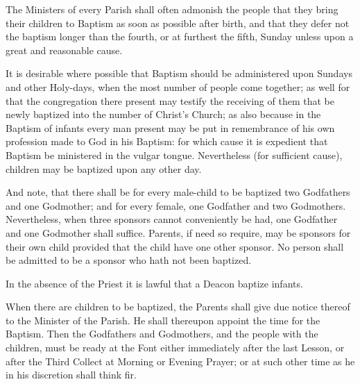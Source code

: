 
\small

\begin{leftbar}

\begin{rubric}
The Ministers of every Parish shall often admonish the people that they bring their children to Baptism as soon as possible after birth, and that they defer not the baptism longer than the fourth, or at furthest the fifth, Sunday unless upon a great and reasonable cause.
\end{rubric}

\begin{rubric}
It is desirable where possible that Baptism should be administered upon Sundays and other Holy-days, when the most number of people come together; as well for that the congregation there present may testify the receiving of them that be newly baptized into the number of Christ's Church; as also because in the Baptism of infants every man present may be put in remembrance of his own profession made to God in his Baptism: for which cause it is expedient that Baptism be ministered in the vulgar tongue.
Nevertheless (for sufficient cause), children may be baptized upon any other day.
\end{rubric}

\begin{rubric}
And note, that there shall be for every male-child to be baptized two Godfathers and one Godmother; and for every female, one Godfather and two Godmothers. Nevertheless, when three sponsors cannot conveniently be had, one Godfather and one Godmother shall suffice.
Parents, if need so require, may be sponsors for their own child provided that the child have one other sponsor.
No person shall be admitted to be a sponsor who hath not been baptized.
\end{rubric}

\begin{rubric}
In the absence of the Priest it is lawful that a Deacon baptize infants.
\end{rubric}

\begin{rubric}
When there are children to be baptized, the Parents shall give due notice thereof to the Minister of the Parish.
He shall thereupon appoint the time for the Baptism.
Then the Godfathers and Godmothers, and the people with the children, must be ready at the Font either immediately after the last Lesson, or after the Third Collect at Morning or Evening Prayer; or at such other time as he in his discretion shall think fir.
\end{rubric}

\end{leftbar}

